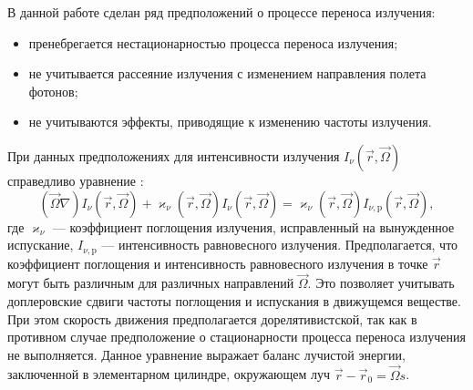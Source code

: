 В данной работе сделан ряд предположений о процессе переноса излучения:
\begin{itemize}
\item пренебрегается нестационарностью процесса переноса излучения;
\item не учитывается рассеяние излучения с изменением направления полета фотонов;
\item не учитываются эффекты, приводящие к изменению частоты излучения.
\end{itemize}
При данных предположениях для интенсивности излучения $I_\nu(\vec r, \vec \Omega)$ справедливо уравнение \cite{zeldovich2008}:
\begin{equation}
(\vec \Omega \nabla) I_\nu(\vec r, \vec \Omega) + \varkappa_\nu(\vec r, \vec \Omega) I_\nu(\vec r, \vec \Omega) = 
\varkappa_\nu(\vec r, \vec \Omega) I_{\nu,\text{p}}(\vec r, \vec \Omega),
\label{eq:transfer}
\end{equation}
где $\varkappa_\nu$ --- коэффициент поглощения излучения, исправленный на вынужденное испускание, $I_{\nu, \text{p}}$ --- интенсивность равновесного излучения. Предполагается, что коэффициент поглощения и интенсивность равновесного излучения в точке $\vec r$ могут быть различным для различных направлений $\vec \Omega$. Это позволяет учитывать доплеровские сдвиги частоты поглощения и испускания в движущемся веществе. При этом скорость движения предполагается дорелятивистской, так как в противном случае предположение о стационарности процесса переноса излучения не выполняется. Данное уравнение выражает баланс лучистой энергии, заключенной в элементарном цилиндре, окружающем луч $\vec r - \vec r_0 = \vec \Omega s$.

